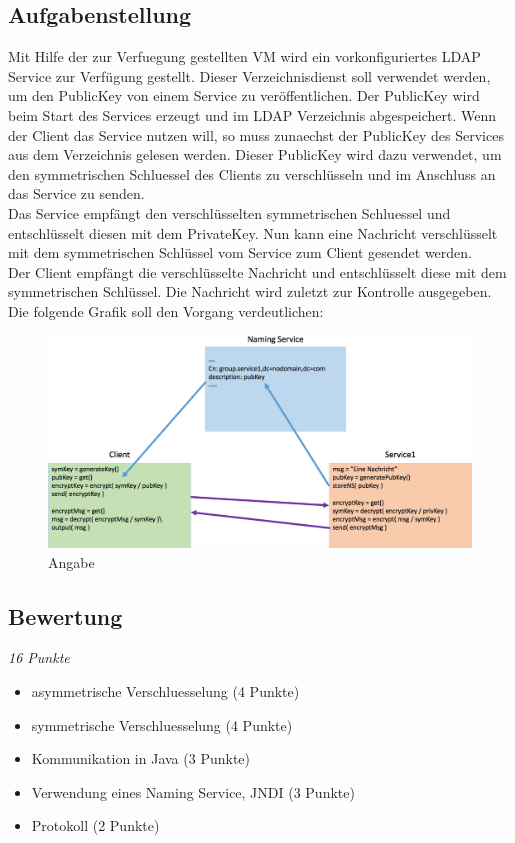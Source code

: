 \documentclass[letterpaper, 12pt]{article}
\let\tempsubsection\subsection
\renewcommand\subsection[1]{\vspace{0cm}\tempsubsection{#1}\vspace{0cm}}
\begin{document}
\subsection{Aufgabenstellung}
Mit Hilfe der zur Verfuegung gestellten VM wird ein vorkonfiguriertes LDAP Service zur Verfügung gestellt. Dieser Verzeichnisdienst soll verwendet werden, um den PublicKey von einem Service zu veröffentlichen. Der PublicKey wird beim Start des Services erzeugt und im LDAP Verzeichnis abgespeichert. Wenn der Client das Service nutzen will, so muss zunaechst der PublicKey des Services aus dem Verzeichnis gelesen werden. Dieser PublicKey wird dazu verwendet, um den symmetrischen Schluessel des Clients zu verschlüsseln und im Anschluss an das Service zu senden. \\
Das Service empfängt den verschlüsselten symmetrischen Schluessel und entschlüsselt diesen mit dem PrivateKey. Nun kann eine Nachricht verschlüsselt mit dem symmetrischen Schlüssel vom Service zum Client gesendet werden. \\
Der Client empfängt die verschlüsselte Nachricht und entschlüsselt diese mit dem symmetrischen Schlüssel. Die Nachricht wird zuletzt zur Kontrolle ausgegeben. \newpage
Die folgende Grafik soll den Vorgang verdeutlichen: 
\begin{figure}[!h]
	\begin{center}
		\includegraphics[width=1\linewidth]{images/dezsys05_java_security_demo1}
		\caption{Angabe}
		\label{Angabe}
	\end{center}
\end{figure}

\subsection{Bewertung}
\textit{16 Punkte}
\begin{itemize}
	\item asymmetrische Verschluesselung (4 Punkte)
	\item symmetrische Verschluesselung (4 Punkte)
	\item Kommunikation in Java (3 Punkte)
	\item Verwendung eines Naming Service, JNDI (3 Punkte)
	\item Protokoll (2 Punkte)
\end{itemize}
\end{document}
